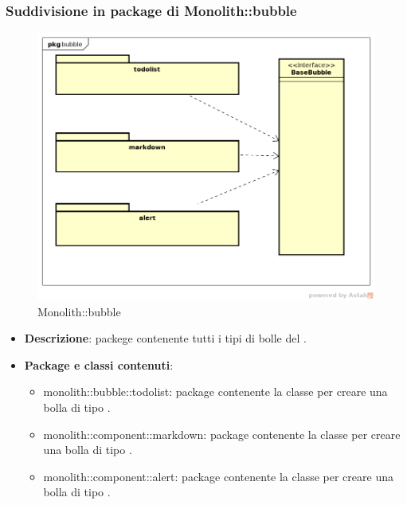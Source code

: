 \subsubsection{Suddivisione in package  di Monolith::bubble}
\label{Monolith::bubble}
\begin{figure}[H]
	\centering
	\includegraphics[scale=0.5]{Sezioni/imgPackage/bubble.png}
	\caption{Monolith::bubble}
\end{figure}
\begin{itemize}
	\item{\textbf{Descrizione}}: packege contenente tutti i tipi di bolle del .
	\item{\textbf{Package e classi contenuti}}:
	\begin{itemize}
	\item{monolith::bubble::todolist}: package contenente la classe per creare una bolla di tipo .
	\item{monolith::component::markdown}: package contenente la classe per creare una bolla di tipo .
	\item{monolith::component::alert}: package contenente la classe per creare una bolla di tipo .

	\end{itemize}

\end{itemize}


